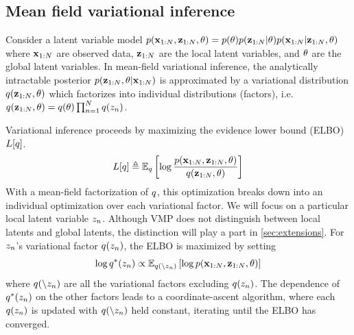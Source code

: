 \subsection{Mean field variational inference}

Consider a latent variable model $p(\mathbf{x}_{1:N}, \mathbf{z}_{1:N}, \theta) = p(\theta)p(\mathbf{z}_{1:N} | \theta)p(\mathbf{x}_{1:N} | \mathbf{z}_{1:N}, \theta)$
where $\mathbf{x}_{1:N}$ are observed data, $\mathbf{z}_{1:N}$ are
the local latent variables, and $\theta$ are the global latent variables.
In mean-field variational inference, 
the analytically intractable
posterior $p(\mathbf{z}_{1:N}, \theta|\mathbf{x}_{1:N})$ is approximated
by a variational distribution $q(\mathbf{z}_{1:N}, \theta)$
which factorizes into individual distributions (factors), i.e.
$q(\mathbf{z}_{1:N}, \theta) = q(\theta)\prod_{n = 1}^N q(z_n)$.

Variational inference proceeds by
maximizing the evidence lower bound (ELBO) $L[q]$.
\begin{equation}
    L[q] \triangleq \mathbb{E}_q\left[\log \frac{p(\mathbf{x}_{1:N}, \mathbf{z}_{1:N}, \theta)}{q(\mathbf{z}_{1:N}, \theta)}\right]
\end{equation}
With a mean-field factorization of $q$, this optimization
breaks down into an individual optimization
over each variational factor. 
We will focus on a particular local latent variable $z_n$.
Although VMP does not distinguish between local latents
and global latents, the distinction will play a part in \autoref{sec:extensions}.
For $z_n$'s variational factor $q(z_n)$,
the ELBO is maximized by setting
\begin{equation}
    \log q^*(z_n) \propto \mathbb{E}_{q(\backslash z_n)} \left[
    \log p(\mathbf{x}_{1:N}, \mathbf{z}_{1:N}, \theta)\right]
\end{equation}
where $q(\backslash z_n)$ are all the variational factors excluding $q(z_n)$.
The dependence of $q^*(z_n)$ on the other factors leads
to a coordinate-ascent algorithm, where 
each $q(z_n)$ is updated with $q(\backslash z_n)$ held constant,
iterating until
the ELBO has converged.

